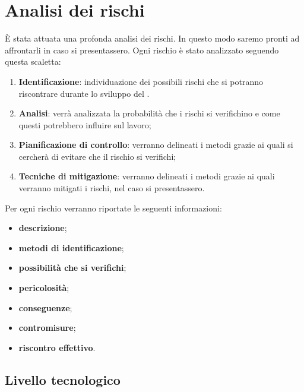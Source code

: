 \section{Analisi dei rischi}
\label{analisiRischi}
	È stata attuata una profonda analisi dei rischi. In questo modo saremo pronti ad affrontarli in caso si presentassero.
	Ogni rischio è stato analizzato seguendo questa scaletta:
	\begin{enumerate}
		\item \textbf{Identificazione}: individuazione dei possibili rischi che si potranno riscontrare durante lo sviluppo del .
		\item \textbf{Analisi}: verrà analizzata la probabilità che i rischi si verifichino e come questi potrebbero influire sul lavoro;
		\item \textbf{Pianificazione di controllo}: verranno delineati i metodi grazie ai quali si cercherà di evitare che il rischio si verifichi;
		\item \textbf{Tecniche di mitigazione}: verranno delineati i metodi grazie ai quali verranno mitigati i rischi, nel caso si presentassero.
	\end{enumerate}
	Per ogni rischio verranno riportate le seguenti informazioni:
	\begin{itemize}
		\item \textbf{descrizione};
		\item \textbf{metodi di identificazione};
		\item \textbf{possibilità che si verifichi};
		\item \textbf{pericolosità};
		\item \textbf{conseguenze};
		\item \textbf{contromisure};
		\item \textbf{riscontro effettivo}.
	\end{itemize}

	\subsection{Livello tecnologico}

